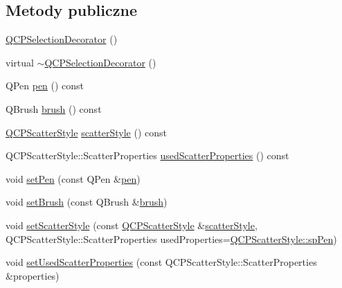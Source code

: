 \subsection*{Metody publiczne}
\begin{DoxyCompactItemize}
\item 
\hyperlink{class_q_c_p_selection_decorator_aa145480d9a062cd176fe30900bb7bca8}{Q\+C\+P\+Selection\+Decorator} ()
\item 
virtual \hyperlink{class_q_c_p_selection_decorator_ab211eb11379854dcbe23b1642be0d19e}{$\sim$\+Q\+C\+P\+Selection\+Decorator} ()
\item 
Q\+Pen \hyperlink{class_q_c_p_selection_decorator_a8365eaa0543756dd6758efa32fbe8041}{pen} () const 
\item 
Q\+Brush \hyperlink{class_q_c_p_selection_decorator_a661b4703ebd3115dc4b07810dd148b20}{brush} () const 
\item 
\hyperlink{class_q_c_p_scatter_style}{Q\+C\+P\+Scatter\+Style} \hyperlink{class_q_c_p_selection_decorator_a347df79afebbfd5b5a2c9143214ee5b9}{scatter\+Style} () const 
\item 
Q\+C\+P\+Scatter\+Style\+::\+Scatter\+Properties \hyperlink{class_q_c_p_selection_decorator_ab82ebdb4915fa7f5c1b253e23e780b13}{used\+Scatter\+Properties} () const 
\item 
void \hyperlink{class_q_c_p_selection_decorator_ac2c8192e1e294aa3a4a7f32a859e3d76}{set\+Pen} (const Q\+Pen \&\hyperlink{class_q_c_p_selection_decorator_a8365eaa0543756dd6758efa32fbe8041}{pen})
\item 
void \hyperlink{class_q_c_p_selection_decorator_aa74b626be518ea17055f918d423c8c2d}{set\+Brush} (const Q\+Brush \&\hyperlink{class_q_c_p_selection_decorator_a661b4703ebd3115dc4b07810dd148b20}{brush})
\item 
void \hyperlink{class_q_c_p_selection_decorator_ab403a613289714ff4fd4a0c0371ab116}{set\+Scatter\+Style} (const \hyperlink{class_q_c_p_scatter_style}{Q\+C\+P\+Scatter\+Style} \&\hyperlink{class_q_c_p_selection_decorator_a347df79afebbfd5b5a2c9143214ee5b9}{scatter\+Style}, Q\+C\+P\+Scatter\+Style\+::\+Scatter\+Properties used\+Properties=\hyperlink{class_q_c_p_scatter_style_a8974f6a20f8f6eea7781f0e6af9deb46aa04d012e7c03e455db2b68fdd55c2a04}{Q\+C\+P\+Scatter\+Style\+::sp\+Pen})
\item 
void \hyperlink{class_q_c_p_selection_decorator_a808c1607cd4e83869c04986e332455c0}{set\+Used\+Scatter\+Properties} (const Q\+C\+P\+Scatter\+Style\+::\+Scatter\+Properties \&properties)
\item 

\end{DoxyCompactItemize}
